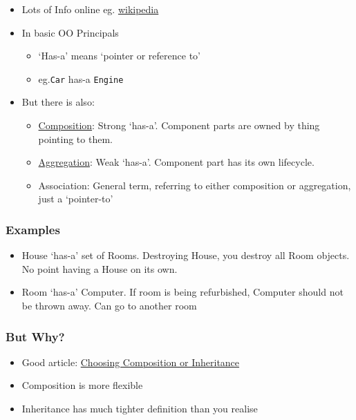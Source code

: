 \begin{itemize}
\tightlist
\item
  Lots of Info online eg.
  \href{https://en.wikipedia.org/wiki/Composition_over_inheritance}{wikipedia}
\item
  In basic OO Principals

  \begin{itemize}
  \tightlist
  \item
    `Has-a' means `pointer or reference to'
  \item
    eg.\texttt{Car} has-a \texttt{Engine}
  \end{itemize}
\item
  But there is also:

  \begin{itemize}
  \tightlist
  \item
    \href{https://en.wikipedia.org/wiki/Object_composition\#Composition}{Composition}:
    Strong `has-a'. Component parts are owned by thing pointing to them.
  \item
    \href{https://en.wikipedia.org/wiki/Object_composition\#Aggregation}{Aggregation}:
    Weak `has-a'. Component part has its own lifecycle.
  \item
    Association: General term, referring to either composition or
    aggregation, just a `pointer-to'
  \end{itemize}
\end{itemize}

\hypertarget{examples}{%
\subsubsection{Examples}\label{examples}}

\begin{itemize}
\tightlist
\item
  House `has-a' set of Rooms. Destroying House, you destroy all Room
  objects. No point having a House on its own.
\item
  Room `has-a' Computer. If room is being refurbished, Computer should
  not be thrown away. Can go to another room
\end{itemize}

\hypertarget{but-why}{%
\subsubsection{But Why?}\label{but-why}}

\begin{itemize}
\tightlist
\item
  Good article:
  \href{https://www.thoughtworks.com/insights/blog/composition-vs-inheritance-how-choose}{Choosing
  Composition or Inheritance}
\item
  Composition is more flexible
\item
  Inheritance has much tighter definition than you realise
\end{itemize}


